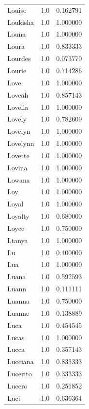 \documentclass[
  letterpaper,
  DIV=11,
  numbers=noendperiod]{scrreprt}
\begin{document}
\begin{tabular}{lrr}
Louise          &   1.0 &   0.162791 \\
Loukisha        &   1.0 &   1.000000 \\
Louna           &   1.0 &   1.000000 \\
Loura           &   1.0 &   0.833333 \\
Lourdes         &   1.0 &   0.073770 \\
Lourie          &   1.0 &   0.714286 \\
Love            &   1.0 &   1.000000 \\
Loveah          &   1.0 &   0.857143 \\
Lovella         &   1.0 &   1.000000 \\
Lovely          &   1.0 &   0.782609 \\
Lovelyn         &   1.0 &   1.000000 \\
Lovelynn        &   1.0 &   1.000000 \\
Lovette         &   1.0 &   1.000000 \\
Lovina          &   1.0 &   1.000000 \\
Lowana          &   1.0 &   1.000000 \\
Loy             &   1.0 &   1.000000 \\
Loyal           &   1.0 &   1.000000 \\
Loyalty         &   1.0 &   0.680000 \\
Loyce           &   1.0 &   0.750000 \\
Ltanya          &   1.0 &   1.000000 \\
Lu              &   1.0 &   0.400000 \\
Lua             &   1.0 &   1.000000 \\
Luana           &   1.0 &   0.592593 \\
Luann           &   1.0 &   0.111111 \\
Luanna          &   1.0 &   0.750000 \\
Luanne          &   1.0 &   0.138889 \\
Luca            &   1.0 &   0.454545 \\
Lucas           &   1.0 &   1.000000 \\
Lucca           &   1.0 &   0.357143 \\
Lucciana        &   1.0 &   0.833333 \\
Lucerito        &   1.0 &   0.333333 \\
Lucero          &   1.0 &   0.251852 \\
Luci            &   1.0 &   0.636364 \\

\end{tabular}
\end{document}
